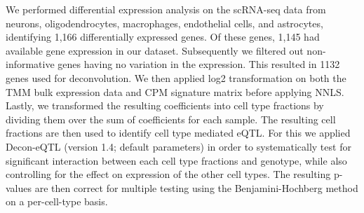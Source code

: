 We performed differential expression analysis on the scRNA-seq data from neurons, oligodendrocytes, macrophages, endothelial cells, and astrocytes, identifying 1,166 differentially expressed genes. Of these genes, 1,145 had available gene expression in our dataset. Subsequently we filtered out non-informative genes having no variation in the expression. This resulted in 1132 genes used for deconvolution. We then applied log2 transformation on both the TMM bulk expression data and CPM signature matrix before applying NNLS. Lastly, we transformed the resulting coefficients into cell type fractions by dividing them over the sum of coefficients for each sample\cite{galtonRegressionMediocrityHereditary1886}. The resulting cell fractions are then used to identify cell type mediated eQTL. For this we applied Decon-eQTL\cite{raulaguirregamboaDeconvolutionBulkBlood2020} (version 1.4; default parameters) in order to systematically test for significant interaction between each cell type fractions and genotype, while also controlling for the effect on expression of the other cell types. The resulting p-values are then correct for multiple testing using the Benjamini-Hochberg method on a per-cell-type basis. 

